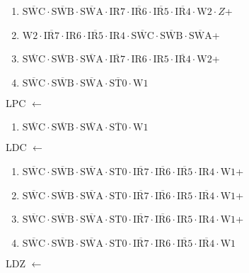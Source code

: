 \documentclass[UTF8]{ctexart}
\begin{document}
\begin{enumerate}[\indent\indent]
	\item $\overline{\text{SWC}} \cdot\overline{\text{SWB}}\cdot \overline{\text{SWA}} \cdot \text{IR7} \cdot \overline{\text{IR6}} \cdot \overline{\text{IR5}} \cdot \overline{\text{IR4}} \cdot \text{W2} \cdot Z$+
	\item $\text{W2} \cdot \overline{\text{IR7}} \cdot \text{IR6} \cdot \overline{\text{IR5}} \cdot \text{IR4} \cdot \overline{\text{SWC}} \cdot\overline{\text{SWB}}\cdot \overline{\text{SWA}}$+
	\item $\overline{\text{SWC}} \cdot\overline{\text{SWB}}\cdot \overline{\text{SWA}} \cdot \overline{\text{IR7}} \cdot \text{IR6} \cdot \text{IR5} \cdot \overline{\text{IR4}} \cdot \text{W2}$+
	\item $\overline{\text{SWC}}\cdot\overline{\text{SWB}}\cdot\overline{\text{SWA}}\cdot\overline{\text{ST0}}\cdot\text{W1}$
\end{enumerate}
\noindent LPC
$\leftarrow$
\begin{enumerate}[\indent\indent]
	\item$\overline{\text{SWC}}\cdot\overline{\text{SWB}}\cdot\overline{\text{SWA}}\cdot\overline{\text{ST0}}\cdot\text{W1}$
\end{enumerate}
\noindent LDC
$\leftarrow$
\begin{enumerate}[\indent\indent]
	\item$\overline{\text{SWC}}\cdot\overline{\text{SWB}}\cdot\overline{\text{SWA}}\cdot\text{ST0}\cdot\overline{\text{IR7}}\cdot\overline{\text{IR6}}\cdot\overline{\text{IR5}}\cdot\text{IR4}\cdot\text{W1}$+
	\item$\overline{\text{SWC}}\cdot\overline{\text{SWB}}\cdot\overline{\text{SWA}}\cdot\text{ST0}\cdot\overline{\text{IR7}}\cdot\overline{\text{IR6}}\cdot{\text{IR5}}\cdot\overline{\text{IR4}}\cdot\text{W1}$+
	\item$\overline{\text{SWC}}\cdot\overline{\text{SWB}}\cdot\overline{\text{SWA}}\cdot\text{ST0}\cdot\overline{\text{IR7}}\cdot\overline{\text{IR6}}\cdot\text{IR5}\cdot\text{IR4}\cdot\text{W1}$+
	\item$\overline{\text{SWC}}\cdot\overline{\text{SWB}}\cdot\overline{\text{SWA}}\cdot\text{ST0}\cdot\overline{\text{IR7}}\cdot{\text{IR6}}\cdot\overline{\text{IR5}}\cdot\overline{\text{IR4}}\cdot\text{W1}$
\end{enumerate}
\noindent LDZ
$\leftarrow$
\end{document}
